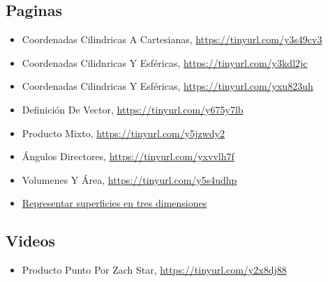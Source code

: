 \documentclass{article}
\begin{document}
\subsection{Paginas}
\label{sec:org4b0e522}
\begin{itemize}
\item Coordenadas Cilindricas A Cartesianas, \url{https://tinyurl.com/y3s49cv3}
\item Coordenadas Cilidnricas Y Esféricas, \url{https://tinyurl.com/y3kdl2jc}
\item Coordenadas Cilindricas Y Esféricas, \url{https://tinyurl.com/yxu823uh}
\item Definición De Vector, \url{https://tinyurl.com/y675y7lb}
\item Producto Mixto, \url{https://tinyurl.com/y5jzwdy2}
\item Ángulos Directores, \url{https://tinyurl.com/yxvvlh7f}
\item Volumenes Y Área, \url{https://tinyurl.com/y5s4udhp}
\item \href{https://www.gaussianos.com/representar-superficies-en-tres-dimensiones/}{Representar superficies en tres dimensiones}
\end{itemize}

\subsection{Videos}
\label{sec:orgad3a2f1}
\begin{itemize}
\item Producto Punto Por Zach Star, \url{https://tinyurl.com/y2x8dj88}
\end{itemize}
\end{document}
